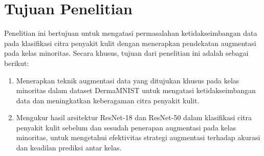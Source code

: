 



\section{Tujuan Penelitian} \label{I.Tujuan}
Penelitian ini bertujuan untuk mengatasi permasalahan ketidakseimbangan 
data pada klasifikasi citra penyakit kulit dengan menerapkan pendekatan 
augmentasi pada kelas minoritas. Secara khusus, tujuan dari penelitian 
ini adalah sebagai berikut: \par

\begin{enumerate}
    \item Menerapkan teknik augmentasi data yang ditujukan khusus pada kelas minoritas dalam dataset DermaMNIST untuk mengatasi ketidakseimbangan data dan meningkatkan keberagaman citra penyakit kulit.
    \item Mengukur hasil arsitektur ResNet-18 dan ResNet-50 dalam klasifikasi citra penyakit kulit sebelum dan sesudah penerapan augmentasi pada kelas minoritas, untuk mengetahui efektivitas strategi augmentasi terhadap akurasi dan keadilan prediksi antar kelas.
\end{enumerate}

